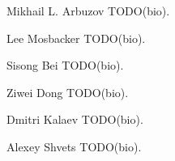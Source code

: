 \documentclass{ieeeaccess}
\begin{document}



\begin{IEEEbiographynophoto}{Mikhail L. Arbuzov}
TODO(bio).
\end{IEEEbiographynophoto}

\begin{IEEEbiographynophoto}{Lee Mosbacker}
TODO(bio).
\end{IEEEbiographynophoto}

\begin{IEEEbiographynophoto}{Sisong Bei}
TODO(bio).
\end{IEEEbiographynophoto}

\begin{IEEEbiographynophoto}{Ziwei Dong}
TODO(bio).
\end{IEEEbiographynophoto}

\begin{IEEEbiographynophoto}{Dmitri Kalaev}
TODO(bio).
\end{IEEEbiographynophoto}

\begin{IEEEbiographynophoto}{Alexey Shvets}
TODO(bio).
\end{IEEEbiographynophoto}

\EOD
\end{document}
